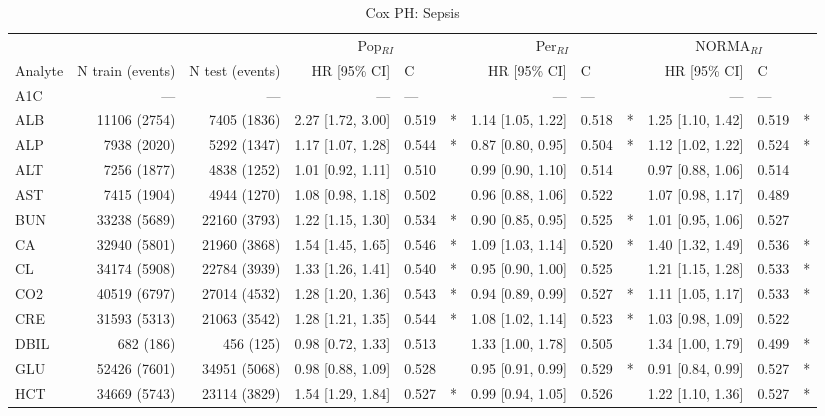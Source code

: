 \begin{table}[ht]
\centering
\footnotesize
\caption{Cox PH: Sepsis}
\begin{tabular}{lrrrlcrlcrlc}
\toprule
 & &  & \multicolumn{3}{c}{Pop$_{RI}$} & \multicolumn{3}{c}{Per$_{RI}$} & \multicolumn{3}{c}{NORMA$_{RI}$} \\
\cmidrule(lr){4-6} \cmidrule(lr){7-9} \cmidrule(lr){10-12}
Analyte & N train (events) & N test (events) & HR [95\% CI] & C &  & HR [95\% CI] & C &  & HR [95\% CI] & C &  \\
\midrule
A1C & --- & --- & --- & --- &  & --- & --- &  & --- & --- &  \\
ALB & 11106 (2754) & 7405 (1836) & 2.27 [1.72, 3.00] & 0.519 & * & 1.14 [1.05, 1.22] & 0.518 & * & 1.25 [1.10, 1.42] & 0.519 & * \\
ALP & 7938 (2020) & 5292 (1347) & 1.17 [1.07, 1.28] & 0.544 & * & 0.87 [0.80, 0.95] & 0.504 & * & 1.12 [1.02, 1.22] & 0.524 & * \\
ALT & 7256 (1877) & 4838 (1252) & 1.01 [0.92, 1.11] & 0.510 &  & 0.99 [0.90, 1.10] & 0.514 &  & 0.97 [0.88, 1.06] & 0.514 &  \\
AST & 7415 (1904) & 4944 (1270) & 1.08 [0.98, 1.18] & 0.502 &  & 0.96 [0.88, 1.06] & 0.522 &  & 1.07 [0.98, 1.17] & 0.489 &  \\
BUN & 33238 (5689) & 22160 (3793) & 1.22 [1.15, 1.30] & 0.534 & * & 0.90 [0.85, 0.95] & 0.525 & * & 1.01 [0.95, 1.06] & 0.527 &  \\
CA & 32940 (5801) & 21960 (3868) & 1.54 [1.45, 1.65] & 0.546 & * & 1.09 [1.03, 1.14] & 0.520 & * & 1.40 [1.32, 1.49] & 0.536 & * \\
CL & 34174 (5908) & 22784 (3939) & 1.33 [1.26, 1.41] & 0.540 & * & 0.95 [0.90, 1.00] & 0.525 &  & 1.21 [1.15, 1.28] & 0.533 & * \\
CO2 & 40519 (6797) & 27014 (4532) & 1.28 [1.20, 1.36] & 0.543 & * & 0.94 [0.89, 0.99] & 0.527 & * & 1.11 [1.05, 1.17] & 0.533 & * \\
CRE & 31593 (5313) & 21063 (3542) & 1.28 [1.21, 1.35] & 0.544 & * & 1.08 [1.02, 1.14] & 0.523 & * & 1.03 [0.98, 1.09] & 0.522 &  \\
DBIL & 682 (186) & 456 (125) & 0.98 [0.72, 1.33] & 0.513 &  & 1.33 [1.00, 1.78] & 0.505 &  & 1.34 [1.00, 1.79] & 0.499 & * \\
GLU & 52426 (7601) & 34951 (5068) & 0.98 [0.88, 1.09] & 0.528 &  & 0.95 [0.91, 0.99] & 0.529 & * & 0.91 [0.84, 0.99] & 0.527 & * \\
HCT & 34669 (5743) & 23114 (3829) & 1.54 [1.29, 1.84] & 0.527 & * & 0.99 [0.94, 1.05] & 0.526 &  & 1.22 [1.10, 1.36] & 0.527 & * \\

\end{tabular}
\end{table}
